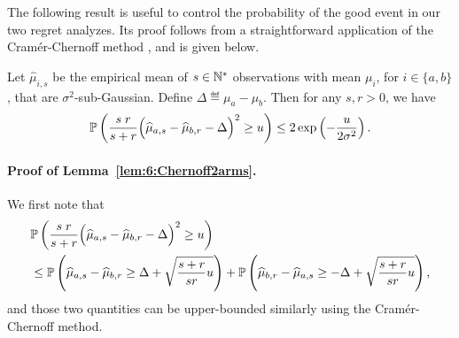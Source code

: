 The following result is useful to control the probability of the good event in our two regret analyzes.
Its proof follows from a straightforward application of the Cram\'er-Chernoff method \cite{Boucheron2013}, and is given below.

\begin{lemma}\label{lem:6:Chernoff2arms}
\begin{leftbar}[lemmabar]  %
    Let $\widehat{\mu}_{i,s}$ be the empirical mean of $s\in\mathbb{N}^*$ \iid{} observations with mean $\mu_i$, for $i \in \{a,b\}$, that are $\sigma^2$-sub-Gaussian.
    Define $\Delta \eqdef \mu_a - \mu_b$. Then for any $s,r > 0$, we have
    \begin{equation}
        \mathbb{P}\left(\frac{s \; r}{s+r}\Big(\widehat{\mu}_{a,s} - \widehat{\mu}_{b,r} - \Delta\Big)^2 \geq u \right) \leq 2\exp\left(- \frac{u}{2\sigma^2}\right).
    \end{equation}
\end{leftbar}  %
\end{lemma}


\paragraph{Proof of Lemma~\ref{lem:6:Chernoff2arms}.}

We first note that
\begin{align}\label{eq:6:Preparation}
	&\mathbb{P}\left(\frac{s \; r}{s+r}\Big(\widehat{\mu}_{a,s} - \widehat{\mu}_{b,r} - \Delta\Big)^2 \geq u \right) \nonumber\\
	&\leq \mathbb{P}\left(\widehat{\mu}_{a,s} - \widehat{\mu}_{b,r} \geq \Delta + \sqrt{\frac{s+r}{sr}u} \right) + \mathbb{P}\left(\widehat{\mu}_{b,r} - \widehat{\mu}_{a,s} \geq -\Delta + \sqrt{\frac{s+r}{sr}u} \right),
\end{align}
and those two quantities can be upper-bounded similarly using the Cram\'er-Chernoff method.

